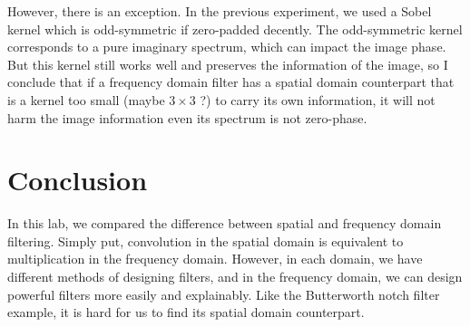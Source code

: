\documentclass[
]{article}
\begin{document}
However, there is an exception. In the previous experiment, we used a
Sobel kernel which is odd-symmetric if zero-padded decently. The
odd-symmetric kernel corresponds to a pure imaginary spectrum, which can
impact the image phase. But this kernel still works well and preserves
the information of the image, so I conclude that if a frequency domain
filter has a spatial domain counterpart that is a kernel too small
(maybe \(3\times 3 \) ?) to carry its own information, it will not harm
the image information even its spectrum is not zero-phase.

\hypertarget{conclusion}{%
\section{Conclusion}\label{conclusion}}

In this lab, we compared the difference between spatial and frequency
domain filtering. Simply put, convolution in the spatial domain is
equivalent to multiplication in the frequency domain. However, in each
domain, we have different methods of designing filters, and in the
frequency domain, we can design powerful filters more easily and
explainably. Like the Butterworth notch filter example, it is hard for
us to find its spatial domain counterpart.
\end{document}
